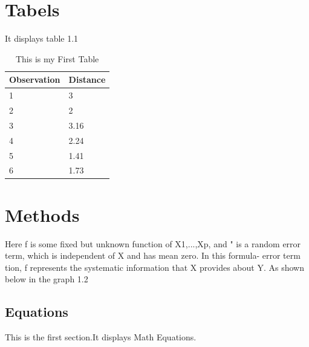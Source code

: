 \documentclass[12pt, letterpaper]{article}
\begin{document}
\section{Tabels}
\label{sec:tab}

It displays table 1.1

\begin{table}[tbp]
\centering
\caption{This is my First Table}
\begin{tabular}{|l|l|}  
\hline
Observation & Distance \\ \hline
1           & 3        \\
2           & 2        \\ 
3           & 3.16     \\ 
4           & 2.24     \\ 
5           & 1.41     \\ 
6           & 1.73     \\ \hline
\end{tabular}
\end{table}

\section{Methods}
\label{sec:meth}


Here f is some fixed but unknown function of X1,...,Xp, and " is a random
error term, which is independent of X and has mean zero. In this formula- error term
tion, f represents the systematic information that X provides about Y. As shown below in the graph 1.2

\subsection{Equations}
This is the first section.It displays Math Equations.
\end{document}
